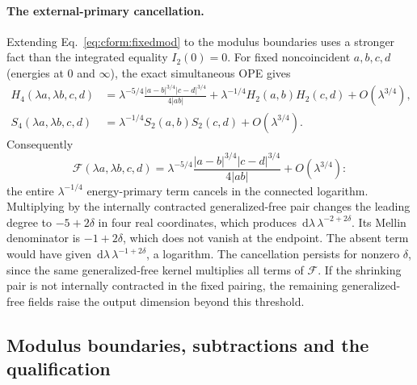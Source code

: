 \documentclass[11pt,a4paper]{article}
\numberwithin{equation}{section}
\newcommand{\dd}{\,\mathrm d}
\begin{document}
\paragraph{The external-primary cancellation.} Extending Eq.~\eqref{eq:cform:fixedmod} to the modulus boundaries uses a
stronger fact than the integrated equality $I_2(0)=0$. For fixed noncoincident $a,b,c,d$ (energies at $0$ and
$\infty$), the exact simultaneous OPE gives
\begin{equation}
\begin{aligned}
 H_4(\lambda a,\lambda b,c,d)&=\lambda^{-5/4}\frac{|a-b|^{3/4}|c-d|^{3/4}}{4|ab|}
 +\lambda^{-1/4}H_2(a,b)H_2(c,d)+O(\lambda^{3/4}),\\
 S_4(\lambda a,\lambda b,c,d)&=\lambda^{-1/4}S_2(a,b)S_2(c,d)+O(\lambda^{3/4}).
\end{aligned}
\end{equation}
Consequently
\begin{equation}
 \mathcal F(\lambda a,\lambda b,c,d)=\lambda^{-5/4}\frac{|a-b|^{3/4}|c-d|^{3/4}}{4|ab|}+O(\lambda^{3/4}):
 \label{eq:cform:external}
\end{equation}
the entire $\lambda^{-1/4}$ energy-primary term cancels in the connected logarithm. Multiplying by the internally
contracted generalized-free pair changes the leading degree to $-5+2\delta$ in four real coordinates, which produces
$\dd\lambda\,\lambda^{-2+2\delta}$. Its Mellin denominator is $-1+2\delta$, which does not vanish at the endpoint. The
absent term would have given $\dd\lambda\,\lambda^{-1+2\delta}$, a logarithm. The cancellation persists for nonzero
$\delta$, since the same generalized-free kernel multiplies all terms of $\mathcal F$. If the shrinking pair is not
internally contracted in the fixed pairing, the remaining generalized-free fields raise the output dimension beyond
this threshold.

\subsection{Modulus boundaries, subtractions and the qualification}\label{app:cform:qualification}
\end{document}

